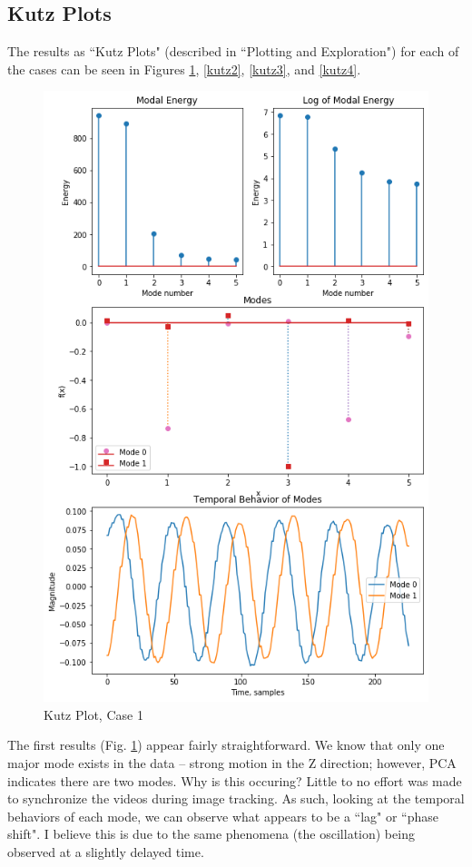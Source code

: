 \documentclass[journal]{IEEEtran}
\begin{document}
\subsection{Kutz Plots}
The results as ``Kutz Plots" (described in ``Plotting and Exploration") for each of the cases can 
be seen in Figures \ref{kutz1}, \ref{kutz2}, \ref{kutz3}, and \ref{kutz4}.

\begin{figure}
	\centerline{\includegraphics[width=\columnwidth]{kutz1.png}}
	\caption{Kutz Plot, Case 1}
	\label{kutz1}
\end{figure}

The first results (Fig. \ref{kutz1}) appear fairly straightforward. We know that only one major mode exists
in the data -- strong motion in the Z direction; however, PCA indicates there are two modes. Why
is this occuring? Little to no effort was made to synchronize the videos during image tracking. As
such, looking at the temporal behaviors of each mode, we can observe what appears to be a ``lag" or
``phase shift". I believe this is due to the same phenomena (the oscillation) being observed at a
slightly delayed time.
\end{document}
